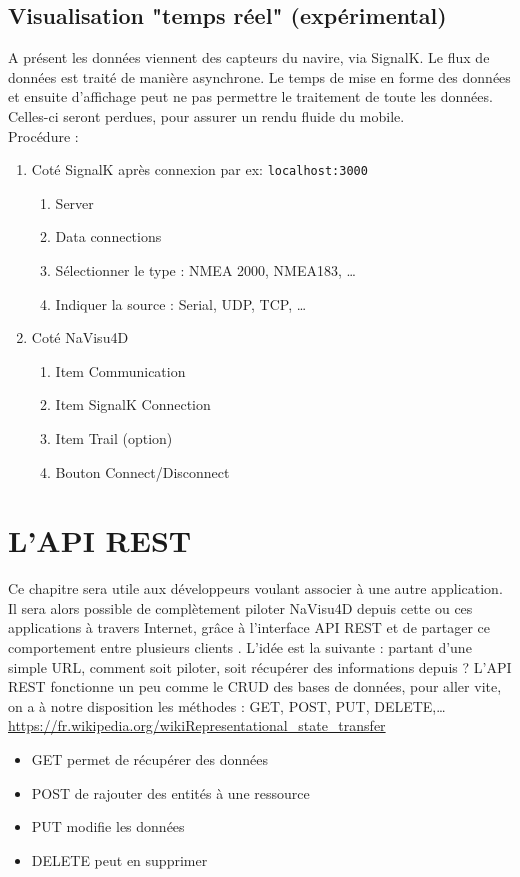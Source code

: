 \section{Visualisation "temps réel" (expérimental)}
A présent les données viennent des capteurs du navire, via SignalK. Le flux de données est traité de manière 
asynchrone. Le temps de mise en forme des données et ensuite d'affichage peut ne pas permettre le traitement de
toute les données. Celles-ci seront perdues, pour assurer un rendu fluide du mobile.\\
Procédure : 
\begin{enumerate}
\item Coté SignalK après connexion par ex: {\tt localhost:3000}
\begin{enumerate}
\item Server
\item Data connections
\item Sélectionner le type : NMEA 2000, NMEA183, \ldots
\item Indiquer la source : Serial, UDP, TCP, \ldots
\end{enumerate}
\item Coté NaVisu4D
\begin{enumerate}
\item Item Communication
\item Item SignalK Connection
\item Item Trail (option)
\item Bouton Connect/Disconnect
\end{enumerate}
\end{enumerate}
\chapter{L'API REST}
Ce chapitre sera utile aux développeurs voulant associer \nav à une autre application. Il sera alors possible de complètement piloter NaVisu4D depuis cette ou ces applications à travers Internet, grâce à l'interface API REST
et de partager ce comportement entre plusieurs clients \nav.
L'idée est la suivante : partant d'une simple URL, comment soit piloter, soit récupérer des informations depuis \nav ? L'API REST fonctionne un peu comme le CRUD des bases de données, pour aller vite, on a à notre disposition les méthodes :
GET, POST, PUT, DELETE,\ldots\\
\href{https://fr.wikipedia.org/wiki/Representational\_state\_transfer}{https://fr.wikipedia.org/wikiRepresentational\_state\_transfer}\\
\begin{itemize}
\item GET permet de récupérer des données
\item POST de rajouter des entités à une ressource
\item PUT  modifie les données
\item DELETE peut en supprimer
\end{itemize}


